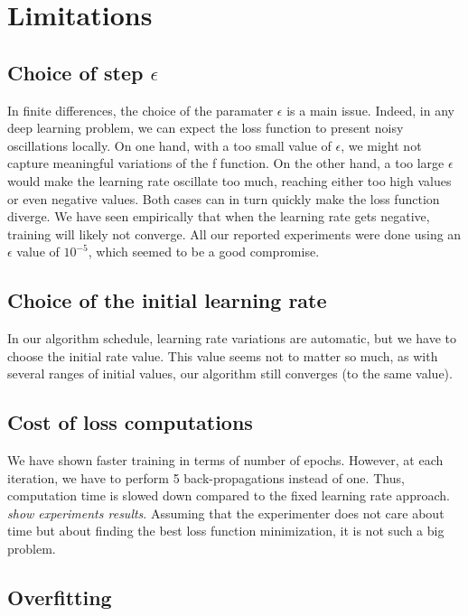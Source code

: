 \documentclass{article}
\begin{document}
  \section{Limitations}
  
  \subsection{Choice of step $\epsilon$}
  
  In finite differences, the choice of the paramater $\epsilon$ is a main issue. Indeed, in any deep learning problem, we can expect the loss function to present noisy oscillations locally. On one hand, with a too small value of $\epsilon$, we might not capture meaningful variations of the f function. On the other hand, a too large $\epsilon$ would make the learning rate oscillate too much, reaching either too high values or even negative values. Both cases can in turn quickly make the loss function diverge. We have seen empirically that when the learning rate gets negative, training will likely not converge. All our reported experiments were done using an $\epsilon$ value of $10^{-5}$, which seemed to be a good compromise.
  
  \subsection{Choice of the initial learning rate}
  
  In our algorithm schedule, learning rate variations are automatic, but we have to choose the initial rate value. This value seems not to matter so much, as with several ranges of initial values, our algorithm still converges (to the same value).
  
  \subsection{Cost of loss computations}
  
  We have shown faster training in terms of number of epochs. However, at each iteration, we have to perform 5 back-propagations instead of one. Thus, computation time is slowed down compared to the fixed learning rate approach. \emph{show experiments results}. Assuming that the experimenter does not care about time but about finding the best loss function minimization, it is not such a big problem.
  
  \subsection{Overfitting}
  
\end{document}
